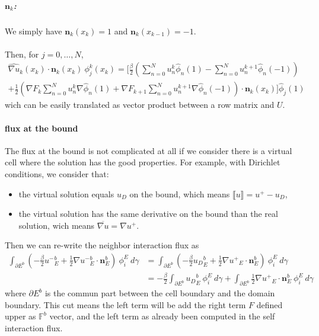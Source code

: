 \documentclass[a4paper,10pt]{article}
\begin{document}
\subparagraph{$\mathbf{n}_k$:} We simply have $\mathbf{n}_k(x_k) = 1$ and $\mathbf{n}_k(x_{k-1}) = 
-1$.

\paragraph{}

Then, for $j=0,\dots,N$,
\begin{multline*}
 \widehat{\nabla u}_k(x_k) \cdot \mathbf{n}_k(x_k)\ \phi_j^k(x_k) 
 = \Bigg[ \frac{\beta}{2} \left( \sum_{n=0}^N u_n^k \hat \phi_n(1) - \sum_{n=0}^N u_n^{k+1} 
\hat 
\phi_n(-1) \right) 
\\+ \frac{1}{2} \left(\nabla F_k \sum_{n=0}^N u_n^k \nabla \hat \phi_n(1) + \nabla F_{k+1} 
\sum_{n=0}^N u_n^{k+1} \nabla \hat \phi_n(-1) \right) \cdot \mathbf{n}_k(x_k) \Bigg] 
\hat \phi_j(1)
\end{multline*}
wich can be easily translated as vector product between a row matrix and $U$.

\vspace{10cm}

\paragraph{flux at the bound}
The flux at the bound is not complicated at all if we consider there is a virtual cell where the 
solution has the good properties. For example, with Dirichlet conditions, we consider that:
\begin{itemize}
 \item the virtual solution equals $u_D$ on the bound, which means $\llbracket u \rrbracket = u^+ 
- u_D$,
 \item the virtual solution has the same derivative on the bound than the real solution, wich means 
$\overline{\nabla u} = \nabla u^+$.
\end{itemize}

Then we can re-write the neighbor interaction flux as
\begin{align*}
 \int_{\partial E^b} \left( -\frac{\beta}{2} {u^-}_E^b + \frac{1}{2} \nabla {u^-}_E^b \cdot 
\mathbf{n}_E^b \right) \ \phi_i^E\ d\gamma
&= \int_{\partial E^b} \left( -\frac{\beta}{2} {u_D}_E^b + \frac{1}{2} \nabla {u^+}_E \cdot 
\mathbf{n}_E^b \right) \ \phi_i^E\ d\gamma \\
&= -\frac{\beta}{2} \int_{\partial E^b} {u_D}_E^b \ \phi_i^E\ d\gamma + \int_{\partial E^b} 
\frac{1}{2} \nabla {u^+}_E \cdot \mathbf{n}_E^b\ \phi_i^E\ d\gamma 
\end{align*}
where $\partial E^b$ is the commun part between the cell boundary and the domain boundary.
This cut means the left term will be add the right term $F$ defined upper as $\mathbb{F}^b$ vector, 
and the left term as already been computed in the self interaction flux.
\end{document}
